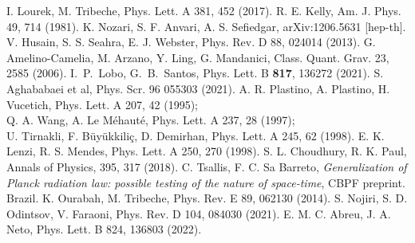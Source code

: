 \documentclass[twocolumn,preprintnumbers,amsmath,nofootinbib,amssymb]{revtex4}
\begin{document}
\begin{thebibliography}{10}
 I. Lourek, M. Tribeche, Phys. Lett. A 381, 452 (2017).
 R. E. Kelly, Am. J. Phys. 49, 714 (1981).
 K. Nozari, S. F. Anvari, A. S. Sefiedgar, arXiv:1206.5631 [hep-th].
 V. Husain, S. S. Seahra, E. J. Webster, Phys. Rev. D 88, 024014 (2013).
 G. Amelino-Camelia, M. Arzano, Y. Ling, G. Mandanici, Class. Quant. Grav. 23, 2585 (2006).
 I.~P.~Lobo, G.~B.~Santos, Phys. Lett. B \textbf{817}, 136272 (2021).
 S. Aghababaei et al, Phys. Scr. 96 055303 (2021).
 A. R. Plastino, A. Plastino, H. Vucetich, Phys. Lett. A 207, 42 (1995);\\ Q. A. Wang, A. Le M\'{e}haut\'{e}, Phys. Lett. A
237, 28 (1997);\\ U. Tirnakli, F. B\"{u}y\"{u}kkili\c{c}, D. Demirhan, Phys. Lett. A 245, 62 (1998).
 E. K. Lenzi, R. S. Mendes, Phys. Lett. A 250, 270 (1998).
 S. L. Choudhury, R. K. Paul, Annals of Physics, 395, 317 (2018).
 C. Tsallis, F. C. Sa Barreto, \textit{Generalization of Planck radiation law: possible testing of the nature of space-time}, CBPF preprint. Brazil.
 K. Ourabah, M. Tribeche, Phys. Rev. E 89, 062130 (2014).
 S. Nojiri, S. D. Odintsov, V. Faraoni, Phys. Rev. D 104, 084030 (2021).
 E. M. C. Abreu, J. A. Neto, Phys. Lett. B 824, 136803 (2022).
\end{thebibliography}
\end{document}
